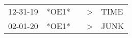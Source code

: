 \begin{supertabular}{lllll}
 12-31-19 &  *OE1* &   &  \textgreater &  TIME \\
 02-01-20 &  *OE1* &   &  \textgreater &  JUNK \\
\end{supertabular}

